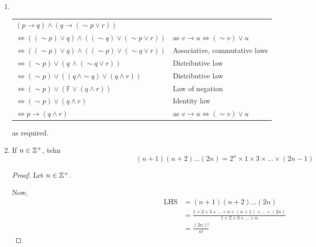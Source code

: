 
\begin{enumerate}
\item ~

    \begin{tabular}{l l}
    $(p \rightarrow q) \wedge (q \rightarrow (\sim p \vee r))$ &  \\
    $\Leftrightarrow ((\sim p) \vee q) \wedge ((\sim q) \vee (\sim p \vee r))$
        & as $v \rightarrow u \Leftrightarrow (\sim v) \vee u$ \\
    $\Leftrightarrow ((\sim p) \vee q) \wedge ((\sim p) \vee (\sim q \vee r))$
        & Associative, commutative laws \\
    $\Leftrightarrow (\sim p) \vee (q\, \wedge (\sim q \vee r))$
        & Distributive law \\
    $\Leftrightarrow (\sim p) \vee ((q\, \wedge \sim q) \vee (q \wedge r))$
        & Distributive law \\
    $\Leftrightarrow (\sim p) \vee (\mathbb{F} \vee (q \wedge r))$
        & Law of negation \\
    $\Leftrightarrow (\sim p) \vee (q \wedge r)$
        & Identity law \\
    $\Leftrightarrow p \rightarrow (q \wedge r)$
        & as $v \rightarrow u \Leftrightarrow (\sim v) \vee u$ \\
    \end{tabular}

    as required.

\item
    \begin{theorem}
        If $n \in \mathbb{Z}^+$, tehn
        $$(n+1)(n+2)\dots(2n) = 2^n \times 1 \times 3 \times \dots \times (2n-1)$$
    \end{theorem}
    \begin{proof}
        Let $n \in \mathbb{Z}^+$.

        Now,
        \begin{align*}
            \textrm{LHS} &= (n+1)(n+2)\dots(2n) \\
            &= \frac{1 \times 2 \times 3 \times \dots \times n \times (n+1) \times \dots \times (2n)}{1 \times 2 \times 3 \times \dots \times n} \\
            &= \frac{(2n)!}{n!}
        \end{align*}


\end{proof}
\end{enumerate}
